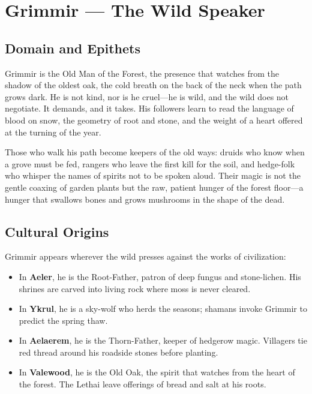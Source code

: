 \section{Grimmir — The Wild Speaker}

\subsection{Domain and Epithets}

Grimmir is the Old Man of the Forest, the presence that watches from the shadow of the oldest oak, the cold breath on the back of the neck when the path grows dark. He is not kind, nor is he cruel—he is wild, and the wild does not negotiate. It demands, and it takes. His followers learn to read the language of blood on snow, the geometry of root and stone, and the weight of a heart offered at the turning of the year.

Those who walk his path become keepers of the old ways: druids who know when a grove must be fed, rangers who leave the first kill for the soil, and hedge-folk who whisper the names of spirits not to be spoken aloud. Their magic is not the gentle coaxing of garden plants but the raw, patient hunger of the forest floor—a hunger that swallows bones and grows mushrooms in the shape of the dead.

\subsection{Cultural Origins}

Grimmir appears wherever the wild presses against the works of civilization:

\begin{itemize}
\item In \textbf{Aeler}, he is the Root-Father, patron of deep fungus and stone-lichen. His shrines are carved into living rock where moss is never cleared.
\item In \textbf{Ykrul}, he is a sky-wolf who herds the seasons; shamans invoke Grimmir to predict the spring thaw.
\item In \textbf{Aelaerem}, he is the Thorn-Father, keeper of hedgerow magic. Villagers tie red thread around his roadside stones before planting.
\item In \textbf{Valewood}, he is the Old Oak, the spirit that watches from the heart of the forest. The Lethai leave offerings of bread and salt at his roots.
\end{itemize}

